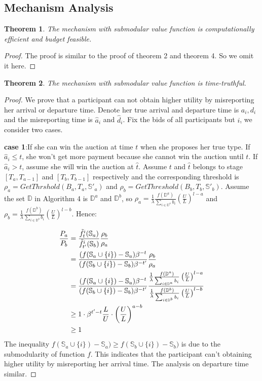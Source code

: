 \documentclass[10pt,journal,letterpaper,compsoc]{IEEEtran}
\newtheorem{theorem}{Theorem}
\begin{document}
\subsection{Mechanism Analysis}
\begin{theorem}
The mechanism with submodular value function is computationally efficient and budget feasible.
\end{theorem}
\begin{proof}
The proof is similar to the proof of theorem 2 and theorem 4. So we omit it here.
\end{proof}
\begin{theorem}
The mechanism with submodular value function is time-truthful.
\end{theorem}
\begin{proof}
We prove that a participant can not obtain higher utility by misreporting her arrival or departure time. Denote her true arrival and departure time is $a_i, d_i$ and the misreporting time is $\hat{a}_i$ and $\hat{d}_i$. Fix the bids of all participants but $i$, we consider two cases.

\textbf{case 1}:If she can win the auction at time $t$ when she proposes her true type. If $\hat{a}_i\le t$, she won't get more payment because she cannot win the auction until $t$. If $\hat{a}_i>t$, assume she will win the auction at $\hat{t}$. Assume $t$ and $\hat{t}$ belongs to stage $[T_a,T_{a-1}]$ and $[T_b,T_{b-1}]$ respectively and the corresponding threshold is $\rho_a=GetThrshold(B_a, T_a, \mathbb{S'}_a)$ and $\rho_b=GetThreshold(B_b,T_b,\mathbb{S'}_b)$. Assume the set $\mathbb{D}$ in Algorithm 4 is $\mathbb{D}^a$ and $\mathbb{D}^b$, so
$\rho_a=\frac{1}{\lambda}\frac{f(\mathbb{D}^{a})}{\sum_{i\in\mathbb{D}^{a}}b_i}\left(\frac{U}{L}\right)^{l-a}$ and $\rho_b=\frac{1}{\lambda}\frac{f(\mathbb{D}^{b})}{\sum_{i\in\mathbb{D}^{b}}b_i}\left(\frac{U}{L}\right)^{l-b}$. Hence:

\begin{align}
\frac{P_a}{P_b}&=\frac{\tilde{f}^i_t(\mathbb{S}_a)}{\tilde{f}^i_{t'}(\mathbb{S}_b)}\frac{\rho_b}{\rho_a} \notag \\
&=\frac{(f(\mathbb{S}_a\cup\{i\})-\mathbb{S}_a)\beta^{-t}}{(f(\mathbb{S}_b\cup\{i\})-\mathbb{S}_b)\beta^{-t'}}\frac{\rho_b}{\rho_a}\notag \\
&=\frac{(f(\mathbb{S}_a\cup\{i\})-\mathbb{S}_a)\beta^{-t}}{(f(\mathbb{S}_b\cup\{i\})-\mathbb{S}_b)\beta^{-t'}}\frac{\frac{1}{\lambda}\frac{f(\mathbb{D}^{a})}{\sum_{i\in\mathbb{D}^{a}}b_i}\left(\frac{U}{L}\right)^{l-a}}{\frac{1}{\lambda}\frac{f(\mathbb{D}^{b})}{\sum_{i\in\mathbb{D}^{b}}b_i}\left(\frac{U}{L}\right)^{l-b}} \notag \\
&\ge 1 \cdot \beta^{t'-t}\frac{L}{U}  \cdot \left(\frac{U}{L}\right)^{a-b}\notag \\
&\ge 1 \notag
\end{align}
The inequality $f(\mathbb{S}_a\cup\{i\})-\mathbb{S}_a) \ge f(\mathbb{S}_b\cup\{i\})-\mathbb{S}_b)$ is due to the submodularity of function $f$. This indicates that the participant can't obtaining higher utility by misreporting her arrival time. The analysis on departure time similar.


\end{proof}
\end{document}
